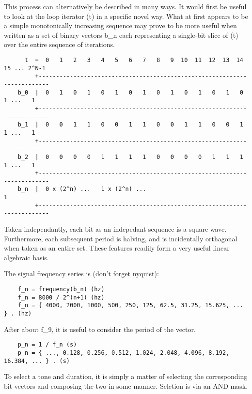 \documentclass[11pt]{book}
\begin{document}
This process can alternatively be described in many ways. It would first be useful to look at the loop iterator (t) in a specific
novel way.  What at first appears to be a simple monotonically increasing sequence may prove to be more useful when written as
a set of binary vectors b\_n each representing a single-bit slice of (t) over the entire sequence of iterations.

\begin{verbatim}
	  t  =  0   1   2   3   4   5   6   7   8   9  10  11  12  13  14  15 ... 2^N-1
	     +-------------------------------------------------------------------------
	b_0  |  0   1   0   1   0   1   0   1   0   1   0   1   0   1   0   1 ...   1
	     +-------------------------------------------------------------------------
	b_1  |  0   0   1   1   0   0   1   1   0   0   1   1   0   0   1   1 ...   1
	     +-------------------------------------------------------------------------
	b_2  |  0   0   0   0   1   1   1   1   0   0   0   0   1   1   1   1 ...   1
	     +-------------------------------------------------------------------------
	b_n  |  0 x (2^n) ...   1 x (2^n) ...                                       1
	     +-------------------------------------------------------------------------
\end{verbatim}

Taken independantly, each bit as an indepedant sequence is a square wave. Furthermore, each subsequent period is halving, and
is incidentally orthagonal when taken as an entire set. These features readily form a very useful linear algebraic basis.

The signal frequency series is (don't forget nyquist):

\begin{verbatim}
	f_n = frequency(b_n) (hz)
	f_n = 8000 / 2^(n+1) (hz)
	f_n = { 4000, 2000, 1000, 500, 250, 125, 62.5, 31.25, 15.625, ... } . (hz)
\end{verbatim}

After about f\_9, it is useful to consider the period of the vector.

\begin{verbatim}
	p_n = 1 / f_n (s)
	p_n = { ..., 0.128, 0.256, 0.512, 1.024, 2.048, 4.096, 8.192, 16.384, ... } . (s)
\end{verbatim}

To select a tone and duration, it is simply a matter of selecting the corresponding bit vectors and composing the two in some manner.
Selction is via an AND mask.
\end{document}
